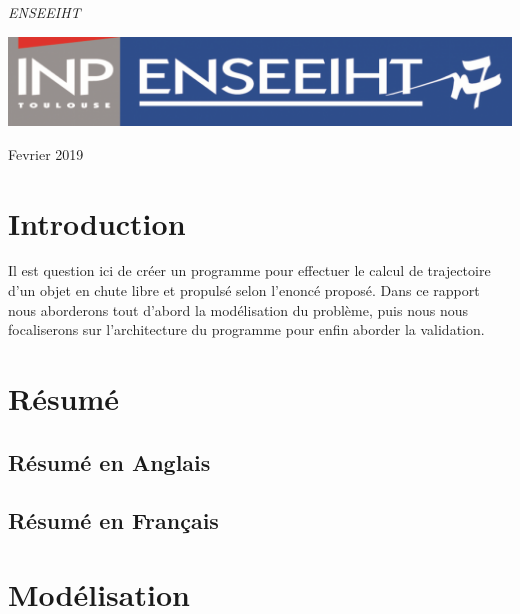 \documentclass[a4paper,oneside]{article}
\begin{document}
\begin{titlepage}
	\vspace{0.5\baselineskip} %

	\textit{ENSEEIHT} %

	\vfill %


	\includegraphics[scale=0.3]{logoN7.png} %

	\vspace{0.3\baselineskip} %

Fevrier 2019 %
\end{titlepage}
\newpage

\tableofcontents
\newpage



\section{Introduction}
Il est question ici de créer un programme pour effectuer le calcul de trajectoire d'un objet en chute libre et propulsé selon l'enoncé proposé.
Dans ce rapport nous aborderons tout d'abord la modélisation du problème, puis nous nous focaliserons sur l'architecture du programme pour enfin aborder la validation.

\section{Résumé}
\subsection{Résumé en Anglais}
\subsection{Résumé en Français}

\section{Modélisation}
\end{document}
